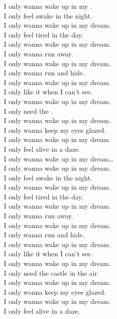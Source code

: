


I only wanna wake up in my . \\
I only feel awake in the night. \\
I only wanna wake up in my dream. \\
I only feel tired in the day. \\
I only wanna wake up in my dream. \\
I only wanna run away. \\
I only wanna wake up in my dream. \\
I only wanna run and hide. \\

I only wanna wake up in my dream. \\
I only like it when I can't see. \\
I only wanna wake up in my dream. \\
I only need the . \\
I only wanna wake up in my dream. \\
I only wanna keep my eyes glazed. \\
I only wanna wake up in my dream. \\
I only feel alive in a daze. \\

I only wanna wake up in my dream… \\

I only wanna wake up in my dream. \\
I only feel awake in the night. \\
I only wanna wake up in my dream. \\
I only feel tired in the day. \\
I only wanna wake up in my dream. \\
I only wanna run away. \\
I only wanna wake up in my dream. \\
I only wanna run and hide. \\

I only wanna wake up in my dream. \\
I only like it when I can't see. \\
I only wanna wake up in my dream. \\
I only need the castle in the air. \\
I only wanna wake up in my dream. \\
I only wanna keep my eyes glazed. \\
I only wanna wake up in my dream. \\
I only feel alive in a daze. \\

